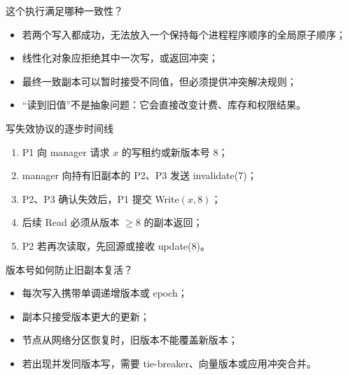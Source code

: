 \documentclass[UTF8,fontset=none,aspectratio=169,10pt]{beamer}
\begin{document}
\begin{frame}{这个执行满足哪种一致性？}
\begin{itemize}
  \item 若两个写入都成功，无法放入一个保持每个进程程序顺序的全局原子顺序；
  \item 线性化对象应拒绝其中一次写，或返回冲突；
  \item 最终一致副本可以暂时接受不同值，但必须提供冲突解决规则；
  \item “读到旧值”不是抽象问题：它会直接改变计费、库存和权限结果。
\end{itemize}
\vfill
{}
\end{frame}

\begin{frame}{写失效协议的逐步时间线}
\begin{enumerate}
  \item P1 向 manager 请求 $x$ 的写租约或新版本号 8；
  \item manager 向持有旧副本的 P2、P3 发送 invalidate(7)；
  \item P2、P3 确认失效后，P1 提交 Write$(x,8)$；
  \item 后续 Read 必须从版本 $\geq 8$ 的副本返回；
  \item P2 若再次读取，先回源或接收 update(8)。
\end{enumerate}
\vfill
{}
\end{frame}

\begin{frame}{版本号如何防止旧副本复活？}
\begin{itemize}
  \item 每次写入携带单调递增版本或 epoch；
  \item 副本只接受版本更大的更新；
  \item 节点从网络分区恢复时，旧版本不能覆盖新版本；
  \item 若出现并发同版本写，需要 tie-breaker、向量版本或应用冲突合并。
\end{itemize}
\begin{center}
\end{center}
\end{frame}
\end{document}
